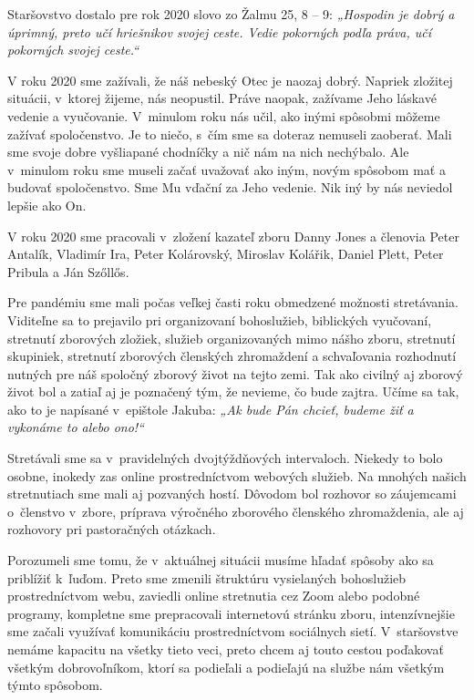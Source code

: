 Staršovstvo dostalo pre rok 2020 slovo zo Žalmu 25, 8 -- 9: {\it „Hospodin je dobrý a úprimný, preto učí hriešnikov svojej ceste. Vedie pokorných podľa práva, učí pokorných svojej ceste.“}

V roku 2020 sme zažívali, že náš nebeský Otec je naozaj dobrý. Napriek zložitej situácii, v~ktorej žijeme, nás neopustil. Práve naopak, zažívame Jeho láskavé vedenie a vyučovanie. V~minulom roku nás učil, ako inými spôsobmi môžeme zažívať spoločenstvo. Je to niečo, s~čím sme sa doteraz nemuseli zaoberať. Mali sme svoje dobre vyšliapané chodníčky a nič nám na nich nechýbalo. Ale v~minulom roku sme museli začať uvažovať ako iným, novým spôsobom mať a budovať spoločenstvo. Sme Mu vďační za Jeho vedenie. Nik iný by nás neviedol lepšie ako On.

V roku 2020 sme pracovali v~zložení kazateľ zboru Danny Jones a členovia Peter Antalík, Vladimír Ira, Peter Kolárovský, Miroslav Kolářik, Daniel Plett, Peter Pribula a Ján Szőllős.

Pre pandémiu sme mali počas veľkej časti roku obmedzené možnosti stretávania. Viditeľne sa to  prejavilo pri organizovaní bohoslužieb, biblických vyučovaní, stretnutí zborových zložiek, služieb organizovaných mimo nášho zboru, stretnutí skupiniek, stretnutí zborových členských zhromaždení a schvaľovania rozhodnutí nutných pre náš spoločný zborový život na tejto zemi. Tak ako civilný aj zborový život bol a zatiaľ aj je poznačený tým, že nevieme, čo bude zajtra. Učíme sa tak, ako to je napísané v~epištole Jakuba: {\it „Ak bude Pán chcieť, budeme žiť a vykonáme to alebo ono!“}

Stretávali sme sa v~pravidelných dvojtýždňových intervaloch. Niekedy to bolo osobne, inokedy zas online prostredníctvom webových služieb. Na mnohých našich stretnutiach sme mali aj pozvaných hostí. Dôvodom bol rozhovor so záujemcami o~členstvo v~zbore, príprava výročného zborového členského zhromaždenia, ale aj rozhovory pri pastoračných otázkach.

Porozumeli sme tomu, že v~aktuálnej situácii musíme hľadať spôsoby ako sa priblížiť k~ľuďom. Preto sme zmenili štruktúru vysielaných bohoslužieb prostredníctvom webu, zaviedli online stretnutia cez Zoom alebo podobné programy, kompletne sme prepracovali internetovú stránku zboru, intenzívnejšie sme začali využívať komunikáciu prostredníctvom sociálnych sietí. V~staršovstve nemáme kapacitu na všetky tieto veci, preto chcem aj touto cestou poďakovať všetkým dobrovoľníkom, ktorí sa podieľali a podieľajú na službe nám všetkým týmto spôsobom.

